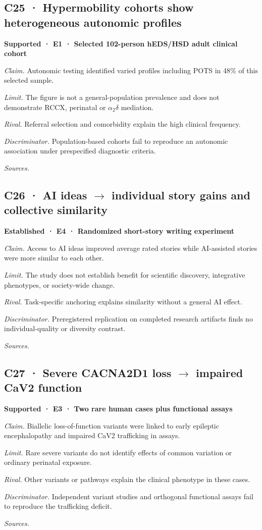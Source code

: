 \subsection*{C25 · Hypermobility cohorts show heterogeneous autonomic profiles}
\noindent\textbf{Supported · E1 · Selected 102-person hEDS/HSD adult clinical cohort}\par
\textit{Claim.} Autonomic testing identified varied profiles including POTS in 48\% of this selected sample.\par
\textit{Limit.} The figure is not a general-population prevalence and does not demonstrate RCCX, perinatal or \ensuremath{\alpha_2\delta} mediation.\par
\textit{Rival.} Referral selection and comorbidity explain the high clinical frequency.\par
\textit{Discriminator.} Population-based cohorts fail to reproduce an autonomic association under prespecified diagnostic criteria.\par
\textit{Sources.} \cite{ref33}\par
\subsection*{C26 · AI ideas \ensuremath{\rightarrow} individual story gains and collective similarity}
\noindent\textbf{Established · E4 · Randomized short-story writing experiment}\par
\textit{Claim.} Access to AI ideas improved average rated stories while AI-assisted stories were more similar to each other.\par
\textit{Limit.} The study does not establish benefit for scientific discovery, integrative phenotypes, or society-wide change.\par
\textit{Rival.} Task-specific anchoring explains similarity without a general AI effect.\par
\textit{Discriminator.} Preregistered replication on completed research artifacts finds no individual-quality or diversity contrast.\par
\textit{Sources.} \cite{ref21}\par
\subsection*{C27 · Severe CACNA2D1 loss \ensuremath{\rightarrow} impaired CaV2 function}
\noindent\textbf{Supported · E3 · Two rare human cases plus functional assays}\par
\textit{Claim.} Biallelic loss-of-function variants were linked to early epileptic encephalopathy and impaired CaV2 trafficking in assays.\par
\textit{Limit.} Rare severe variants do not identify effects of common variation or ordinary perinatal exposure.\par
\textit{Rival.} Other variants or pathways explain the clinical phenotype in these cases.\par
\textit{Discriminator.} Independent variant studies and orthogonal functional assays fail to reproduce the trafficking deficit.\par
\textit{Sources.} \cite{ref35}\par
